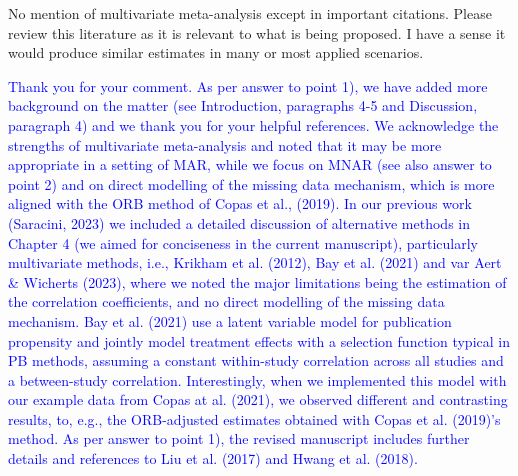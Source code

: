 \documentclass{article}
\begin{document}
\bigskip

No mention of multivariate meta-analysis except in important citations. Please review this literature as it is relevant to what is being proposed. I have a sense it would produce similar estimates in many or most applied scenarios. 


\bigskip

\textcolor{blue}{Thank you for your comment. As per answer to point 1), we have added more background on the matter (see Introduction, paragraphs 4-5 and Discussion, paragraph 4) and we thank you for your helpful references. We acknowledge the strengths of multivariate meta-analysis and noted that it may be more appropriate in a setting of MAR, while we focus on MNAR (see also answer to point 2) and on direct modelling of the missing data mechanism, which is more aligned with the ORB method of Copas et al., (2019). In our previous work (Saracini, 2023) %
  we included a detailed discussion of alternative methods in Chapter 4 (we aimed for conciseness in the current manuscript), particularly multivariate methods, i.e., Krikham et al. (2012), Bay et al. (2021) and var Aert \& Wicherts (2023), where we noted the major limitations being the estimation of the correlation coefficients, and no direct modelling of the missing data mechanism. Bay et al. (2021) use a latent variable model for publication propensity and jointly model treatment effects with a selection function typical in PB methods, assuming a constant within-study correlation across all studies and a between-study correlation. Interestingly, when we implemented this model with our example data from Copas at al. (2021), we observed different and contrasting results, to, e.g., the ORB-adjusted estimates obtained with Copas et al. (2019)'s method. As per answer to point 1), the revised manuscript includes further details and references to Liu et al. (2017) and Hwang et al. (2018).}


\end{document}
